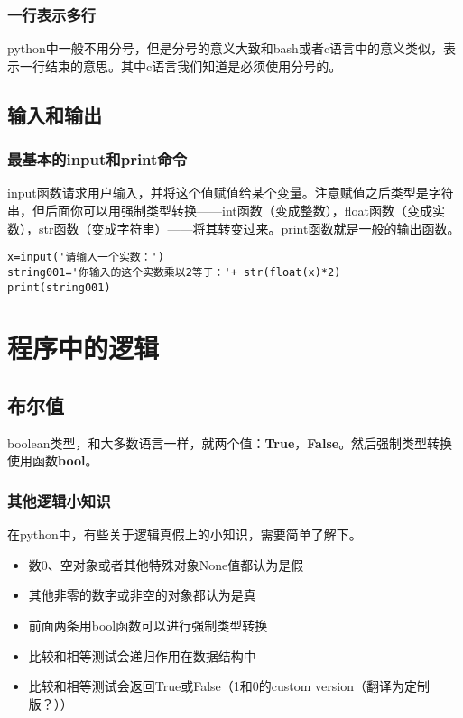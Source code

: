 \documentclass[12pt,oneside]{book}
\begin{document}
\begin{common-format}
\subsection{一行表示多行}
python中一般不用分号，但是分号的意义大致和bash或者c语言中的意义类似，表示一行结束的意思。其中c语言我们知道是必须使用分号的。


\section{输入和输出}
\subsection{最基本的input和print命令}
input函数请求用户输入，并将这个值赋值给某个变量。注意赋值之后类型是字符串，但后面你可以用强制类型转换——int函数（变成整数），float函数（变成实数），str函数（变成字符串）——将其转变过来。print函数就是一般的输出函数。

\begin{Verbatim}
x=input('请输入一个实数：')
string001='你输入的这个实数乘以2等于：'+ str(float(x)*2)
print(string001)
\end{Verbatim}





\chapter{程序中的逻辑}
\section{布尔值}
\label{sec:布尔值}
boolean类型，和大多数语言一样，就两个值：\textbf{True}，\textbf{False}。然后强制类型转换使用函数\textbf{bool}。

\subsection{其他逻辑小知识}
在python中，有些关于逻辑真假上的小知识，需要简单了解下。
\begin{itemize}
\item 数0、空对象或者其他特殊对象None值都认为是假
\item 其他非零的数字或非空的对象都认为是真
\item 前面两条用bool函数可以进行强制类型转换
\item 比较和相等测试会递归作用在数据结构中
\item 比较和相等测试会返回True或False（1和0的custom version（翻译为定制版？））
\end{itemize}


\end{common-format}
\end{document}
